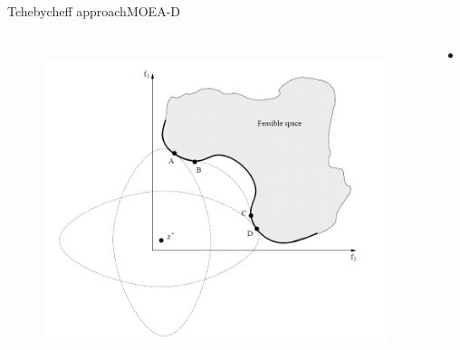 \begin{frame}{Tchebycheff approach}{MOEA-D}
	\begin{columns}
			\begin{figure}
				\centering
				\includegraphics[width=\linewidth]{figure/tchebycheff}
				\label{fig:tchebycheff}
			\end{figure}
		\begin{minipage}{\textwidth}
			\begin{itemize}
				\item 
			\end{itemize}
		\end{minipage}
	\end{columns}	
\end{frame}

